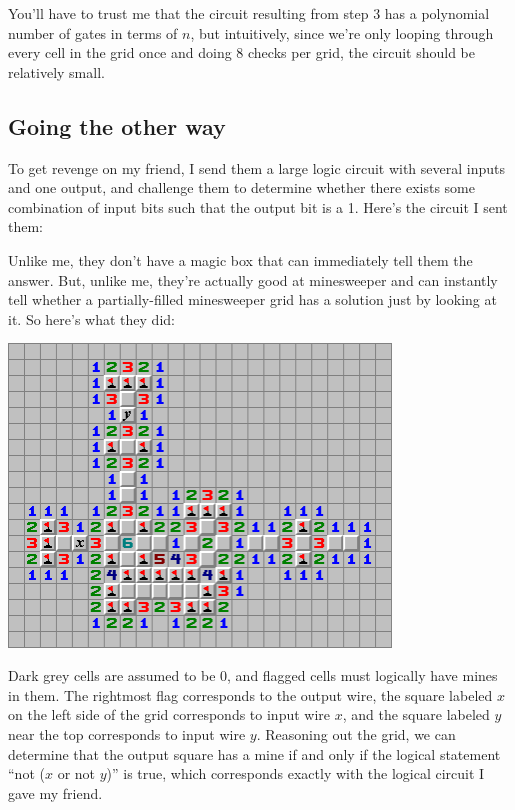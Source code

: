 \documentclass{article}
\begin{document}
You’ll have to trust me that the circuit resulting from step 3 has a polynomial number of gates in terms of $n$, but intuitively, since we’re only looping through every cell in the grid once and doing 8 checks per grid, the circuit should be relatively small.


\subsection{Going the other way}

To get revenge on my friend, I send them a large logic circuit with several inputs and one output, and challenge them to determine whether there exists some combination of input bits such that the output bit is a 1. Here’s the circuit I sent them:

Unlike me, they don’t have a magic box that can immediately tell them the answer. But, unlike me, they’re actually good at minesweeper and can instantly tell whether a partially-filled minesweeper grid has a solution just by looking at it. So here’s what they did:

\begin{center}
    \includegraphics[width=4in]{images/Minesweeper_fig3.png}
\end{center}

Dark grey cells are assumed to be 0, and flagged cells must logically have mines in them. The rightmost flag corresponds to the output wire, the square labeled $x$ on the left side of the grid corresponds to input wire $x$, and the square labeled $y$ near the top corresponds to input wire $y$. Reasoning out the grid, we can determine that the output square has a mine if and only if the logical statement “not ($x$ or not $y$)” is true, which corresponds exactly with the logical circuit I gave my friend.
\end{document}
